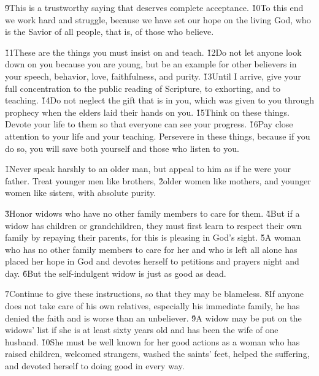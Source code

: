 \v{9}This is a trustworthy saying that deserves complete acceptance. \v{10}To this end we work hard and struggle, because we have set our hope on the living God, who is the Savior of all people, that is, of those who believe.

\v{11}These are the things you must insist on and teach. \v{12}Do not let anyone look down on you because you are young, but be an example for other believers in your speech, behavior, love, faithfulness, and purity. \v{13}Until I arrive, give your full concentration to the public reading of Scripture, to exhorting, and to teaching. \v{14}Do not neglect the gift that is in you, which was given to you through prophecy when the elders laid their hands on you. \v{15}Think on these things. Devote your life to them so that everyone can see your progress. \v{16}Pay close attention to your life and your teaching. Persevere in these things, because if you do so, you will save both yourself and those who listen to you.

\v{1}Never speak harshly to an older man, but appeal to him as if he were your father. Treat younger men like brothers, \v{2}older women like mothers, and younger women like sisters, with absolute purity.

\v{3}Honor widows who have no other family members to care for them. \v{4}But if a widow has children or grandchildren, they must first learn to respect their own family by repaying their parents, for this is pleasing in God's sight. \v{5}A woman who has no other family members to care for her and who is left all alone has placed her hope in God and devotes herself to petitions and prayers night and day. \v{6}But the self-indulgent widow is just as good as dead.

\v{7}Continue to give these instructions, so that they may be blameless. \v{8}If anyone does not take care of his own relatives, especially his immediate family, he has denied the faith and is worse than an unbeliever. \v{9}A widow may be put on the widows' list if she is at least sixty years old and has been the wife of one husband. \v{10}She must be well known for her good actions as a woman who has raised children, welcomed strangers, washed the saints' feet, helped the suffering, and devoted herself to doing good in every way.


